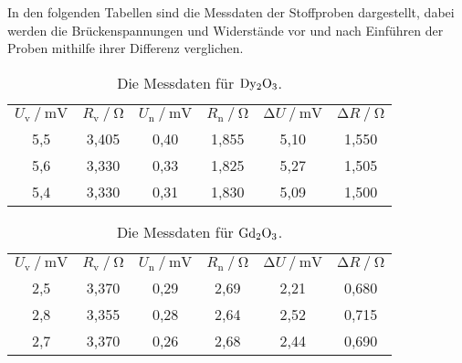 In den folgenden Tabellen sind die Messdaten der Stoffproben dargestellt, 
dabei werden die Brückenspannungen und Widerstände vor und nach Einführen der Proben mithilfe ihrer Differenz verglichen.
\begin{table}[H]
  \centering
  \caption{Die Messdaten für $\ce{Dy2O3}$.}
  \label{tab:dy}
  \begin{tabular}{c c c c c c}
    \toprule 
    
    \multicolumn{1}{c}{$U_\text{v} \mathbin{/} \unit{\milli\volt}$} &
    \multicolumn{1}{c}{$R_\text{v} \mathbin{/} \unit{\ohm} $} &
    \multicolumn{1}{c}{$U_\text{n} \mathbin{/} \unit{\milli\volt}$} &
    \multicolumn{1}{c}{$R_\text{n} \mathbin{/} \unit{\ohm}$}& 
    \multicolumn{1}{c}{$\increment U \mathbin{/} \unit{\milli\volt}$}&
    \multicolumn{1}{c}{$\increment R \mathbin{/} \unit{\ohm}$} \\

    \cmidrule(lr){1-2} \cmidrule(lr){3-4} \cmidrule(lr){5-6}

    5,5 & 3,405 & 0,40 & 1,855 &    5,10 &   1,550 \\
    5,6 & 3,330 & 0,33 & 1,825 &    5,27 &   1,505 \\
    5,4 & 3,330 & 0,31 & 1,830 &    5,09 &   1,500 \\
    \bottomrule
  \end{tabular} 
\end{table}

\begin{table}[H]
  \centering
  \caption{Die Messdaten für $\ce{Gd2O3}$.}
  \label{tab:gd}
  \begin{tabular}{c c c c c c}
    \toprule 
    
    \multicolumn{1}{c}{$U_\text{v} \mathbin{/} \unit{\milli\volt}$} &
    \multicolumn{1}{c}{$R_\text{v} \mathbin{/} \unit{\ohm} $} &
    \multicolumn{1}{c}{$U_\text{n} \mathbin{/} \unit{\milli\volt}$} &
    \multicolumn{1}{c}{$R_\text{n} \mathbin{/} \unit{\ohm}$}& 
    \multicolumn{1}{c}{$\increment U \mathbin{/} \unit{\milli\volt}$}&
    \multicolumn{1}{c}{$\increment R \mathbin{/} \unit{\ohm}$} \\

    \cmidrule(lr){1-2} \cmidrule(lr){3-4} \cmidrule(lr){5-6}

    2,5 & 3,370 & 0,29 & 2,69 &    2,21 &   0,680 \\
    2,8 & 3,355 & 0,28 & 2,64 &    2,52 &   0,715 \\
    2,7 & 3,370 & 0,26 & 2,68 &    2,44 &   0,690 \\    
    \bottomrule
  \end{tabular} 
\end{table}

